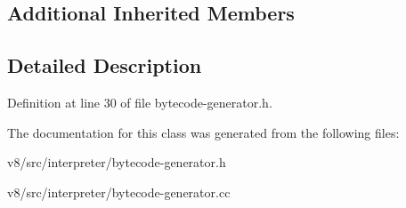 \subsection*{Additional Inherited Members}


\subsection{Detailed Description}


Definition at line 30 of file bytecode-\/generator.\+h.



The documentation for this class was generated from the following files\+:\begin{DoxyCompactItemize}
\item 
v8/src/interpreter/bytecode-\/generator.\+h\item 
v8/src/interpreter/bytecode-\/generator.\+cc\end{DoxyCompactItemize}
